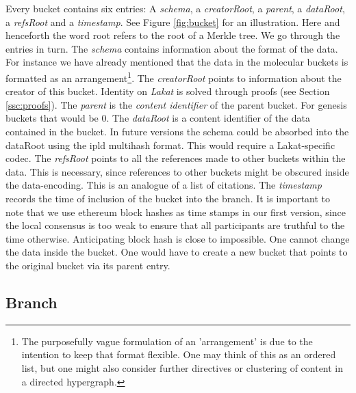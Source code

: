 \documentclass[14pt]{article}
\begin{document}
Every bucket contains six entries: A \textit{schema}, a \textit{creatorRoot}, a \textit{parent}, a \textit{dataRoot}, a \textit{refsRoot} and a \textit{timestamp}. See Figure \ref{fig:bucket} for an illustration. Here and henceforth the word root refers to the root of a Merkle tree. We go through the entries in turn. The \textit{schema} contains information about the format of the data. For instance we have already mentioned that the data in the molecular buckets is formatted as an arrangement\footnote{The purposefully vague formulation of an 'arrangement' is due to the intention to keep that format flexible. One may think of this as an ordered list, but one might also consider further directives or clustering of content in a directed hypergraph.}. The \textit{creatorRoot} points to information about the creator of this bucket. Identity on \textit{Lakat} is solved through proofs (see Section \ref{ssc:proofs}). The \textit{parent} is the \textit{content identifier} of the parent bucket. For genesis buckets that would be 0. The \textit{dataRoot} is a content identifier of the data contained in the bucket. In future versions the schema could be absorbed into the dataRoot using the ipld multihash format. This would require a Lakat-specific codec. The \textit{refsRoot} points to all the references made to other buckets within the data. This is necessary, since references to other buckets might be obscured inside the data-encoding. This is an analogue of a list of citations. The \textit{timestamp} records the time of inclusion of the bucket into the branch. It is important to note that we use ethereum block hashes as time stamps in our first version, since the local consensus is too weak to ensure that all participants are truthful to the time otherwise. Anticipating block hash is close to impossible. One cannot change the data inside the bucket. One would have to create a new bucket that points to the original bucket via its parent entry. 




\subsection{Branch}
\label{ssc:branch}
\end{document}
